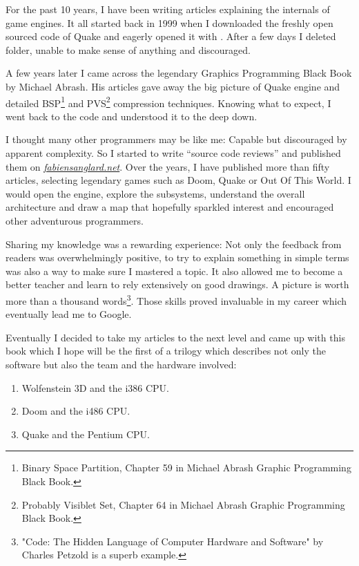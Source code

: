 \documentclass[book.tex]{subfiles}
\begin{document}
For the past 10 years, I have been writing articles explaining the internals of game engines. It all started back in 1999 when I downloaded the freshly open sourced code of \mbox{Quake} and eagerly opened it with . After a few days I deleted  folder, unable to make sense of anything and discouraged.

\bigskip

A few years later I came across the legendary Graphics Programming Black Book by Michael Abrash. His articles gave away the big picture of Quake engine and detailed BSP\footnote{Binary Space Partition, Chapter 59 in Michael Abrash Graphic Programming Black Book.} and PVS\footnote{Probably Visiblet Set, Chapter 64 in Michael Abrash Graphic Programming Black Book.} compression techniques. Knowing what to expect, I went back to the code and understood it to the deep down.

\bigskip

I thought many other programmers may be like me: Capable but discouraged by apparent complexity. So I started to write ``source  code reviews'' and published them on 
\href{http://fabiensanglard.net}{\textit{fabiensanglard.net}}. Over the years, I have published more than fifty articles, selecting legendary games such as Doom, Quake or Out Of This World. I would open the engine, explore the subsystems, understand the overall architecture and draw a map that hopefully sparkled interest and encouraged other adventurous programmers.

\bigskip

Sharing my knowledge was a rewarding experience: Not only the feedback from readers was overwhelmingly positive, to try to explain something in simple terms was also a way to make sure I mastered a topic. It also allowed me to become a better teacher and learn to rely extensively on good drawings. A picture
is worth more than a thousand words\footnote{"Code: The Hidden Language of Computer Hardware and Software" by Charles Petzold is a superb example.}. Those skills proved invaluable in my career which eventually lead me to Google.

\bigskip

Eventually I decided to take my articles to the next level and came up with this book which I hope will be the first of a trilogy which describes not only the software but also the team and the hardware involved:

\begin{enumerate}
\item Wolfenstein 3D and the i386 CPU.
\item Doom and the i486 CPU.
\item Quake and the Pentium CPU.
\end{enumerate}
\end{document}
